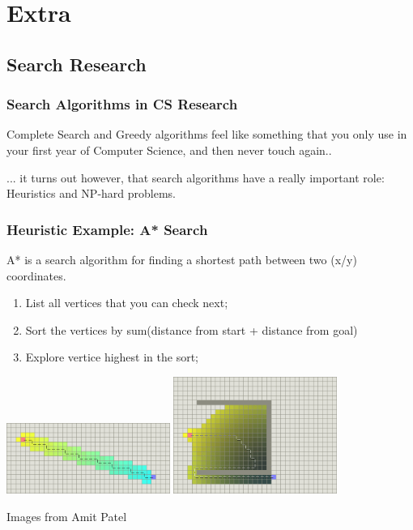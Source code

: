 \documentclass{beamer}
\begin{document}
\section{Extra}
\subsection{Search Research}

\begin{frame}
  \frametitle{Search Algorithms in CS Research}

  Complete Search and Greedy algorithms feel like something that you
  only use in your first year of Computer Science, and then never
  touch again..

  \vfill

  ... it turns out however, that search algorithms have a really
  important role: Heuristics and NP-hard problems.
\end{frame}

\begin{frame}
  \frametitle{Heuristic Example: A* Search} 

  A* is a search algorithm for finding a shortest path between two
  (x/y) coordinates.

  {\small
  \begin{enumerate}
  \item List all vertices that you can check next;
  \item Sort the vertices by sum(distance from start + distance from goal)
  \item Explore vertice highest in the sort;
  \end{enumerate}
  }

  \includegraphics[width=0.4\textwidth]{../img/astar2_amitpatel}\hfill
  \includegraphics[width=0.4\textwidth]{../img/astar_amitpatel}

  \hfill{\tiny Images from Amit Patel}

\end{frame}
\end{document}
